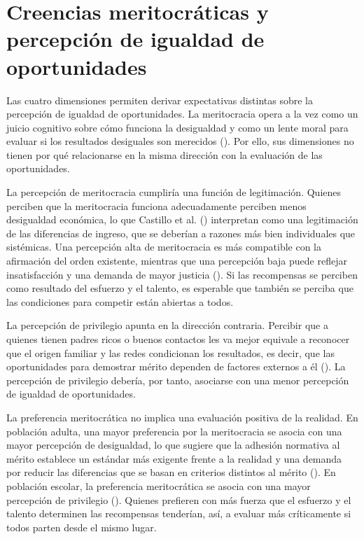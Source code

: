 \documentclass[
  spanish,
  a4paper,
  oneside]{scrbook}
\begin{document}
\section{Creencias meritocráticas y percepción de igualdad de
oportunidades}\label{creencias-meritocruxe1ticas-y-percepciuxf3n-de-igualdad-de-oportunidades}

Las cuatro dimensiones permiten derivar expectativas distintas sobre la
percepción de igualdad de oportunidades. La meritocracia opera a la vez
como un juicio cognitivo sobre cómo funciona la desigualdad y como un
lente moral para evaluar si los resultados desiguales son merecidos
(). Por ello, sus
dimensiones no tienen por qué relacionarse en la misma dirección con la
evaluación de las oportunidades.

La percepción de meritocracia cumpliría una función de legitimación.
Quienes perciben que la meritocracia funciona adecuadamente perciben
menos desigualdad económica, lo que Castillo et al.
() interpretan como una
legitimación de las diferencias de ingreso, que se deberían a razones
más bien individuales que sistémicas. Una percepción alta de
meritocracia es más compatible con la afirmación del orden existente,
mientras que una percepción baja puede reflejar insatisfacción y una
demanda de mayor justicia (). Si las recompensas se perciben como resultado del
esfuerzo y el talento, es esperable que también se perciba que las
condiciones para competir están abiertas a todos.

La percepción de privilegio apunta en la dirección contraria. Percibir
que a quienes tienen padres ricos o buenos contactos les va mejor
equivale a reconocer que el origen familiar y las redes condicionan los
resultados, es decir, que las oportunidades para demostrar mérito
dependen de factores externos a él (). La percepción de privilegio debería, por tanto, asociarse con
una menor percepción de igualdad de oportunidades.

La preferencia meritocrática no implica una evaluación positiva de la
realidad. En población adulta, una mayor preferencia por la meritocracia
se asocia con una mayor percepción de desigualdad, lo que sugiere que la
adhesión normativa al mérito establece un estándar más exigente frente a
la realidad y una demanda por reducir las diferencias que se basan en
criterios distintos al mérito
(). En
población escolar, la preferencia meritocrática se asocia con una mayor
percepción de privilegio (). Quienes prefieren con más fuerza que el esfuerzo y el talento
determinen las recompensas tenderían, así, a evaluar más críticamente si
todos parten desde el mismo lugar.
\end{document}
